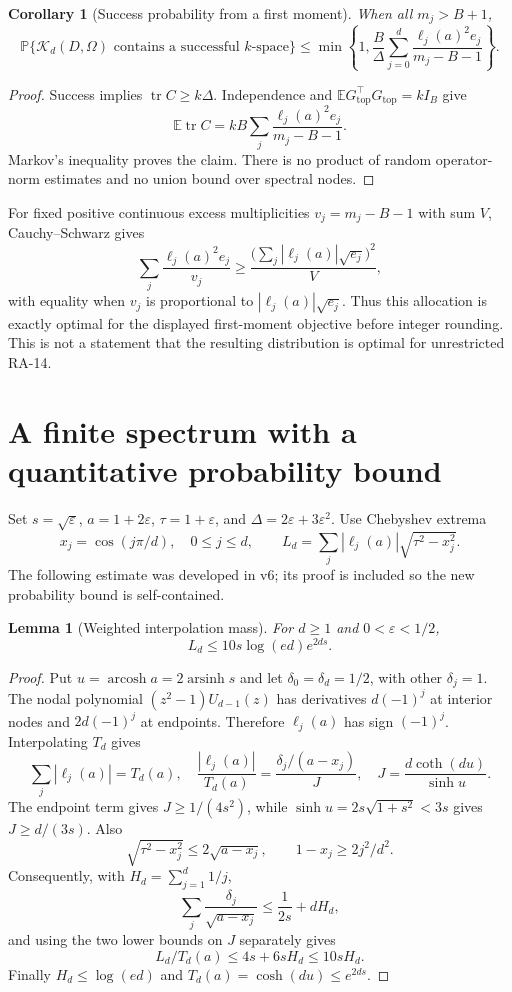 \documentclass[11pt]{article}
\newtheorem{lemma}[theorem]{Lemma}
\newtheorem{corollary}[theorem]{Corollary}
\theoremstyle{definition}
\newcommand{\E}{\mathbb E}
\newcommand{\Prob}{\mathbb P}
\newcommand{\tr}{\operatorname{tr}}
\newcommand{\K}{\mathcal K}
\begin{document}
\begin{corollary}[Success probability from a first moment]\label{cor:moment}
When all $m_j>B+1$,
\begin{equation}\label{eq:exactprob}
 \Prob\{\K_d(D,\Omega)\text{ contains a successful }k\text{-space}\}
 \le \min\left\{1,\frac{B}{\Delta}
 \sum_{j=0}^d\frac{\ell_j(a)^2e_j}{m_j-B-1}\right\}.
\end{equation}
\end{corollary}
\begin{proof}
Success implies $\tr C\ge k\Delta$. Independence and $\E G_{\mathrm{top}}^\top G_{\mathrm{top}}=kI_B$ give
\[
 \E\tr C=kB\sum_j\frac{\ell_j(a)^2e_j}{m_j-B-1}.
\]
Markov's inequality proves the claim. There is no product of random operator-norm estimates and no union bound over spectral nodes.
\end{proof}

For fixed positive continuous excess multiplicities $v_j=m_j-B-1$ with sum $V$, Cauchy--Schwarz gives
\[
 \sum_j\frac{\ell_j(a)^2e_j}{v_j}
 \ge\frac{\big(\sum_j|\ell_j(a)|\sqrt{e_j}\big)^2}{V},
\]
with equality when $v_j$ is proportional to $|\ell_j(a)|\sqrt{e_j}$. Thus this allocation is exactly optimal for the displayed first-moment objective before integer rounding. This is not a statement that the resulting distribution is optimal for unrestricted RA-14.

\section{A finite spectrum with a quantitative probability bound}\label{sec:primitive}
Set $s=\sqrt\varepsilon$, $a=1+2\varepsilon$, $\tau=1+\varepsilon$, and $\Delta=2\varepsilon+3\varepsilon^2$. Use Chebyshev extrema
\[
 x_j=\cos(j\pi/d),\quad 0\le j\le d,\qquad
 L_d=\sum_j|\ell_j(a)|\sqrt{\tau^2-x_j^2}.
\]
The following estimate was developed in v6; its proof is included so the new probability bound is self-contained.

\begin{lemma}[Weighted interpolation mass]\label{lem:mass}
For $d\ge1$ and $0<\varepsilon<1/2$,
\begin{equation}\label{eq:mass}
 L_d\le10s\log(ed)e^{2ds}.
\end{equation}
\end{lemma}
\begin{proof}
Put $u=\operatorname{arcosh}a=2\operatorname{arsinh}s$ and let $\delta_0=\delta_d=1/2$, with other $\delta_j=1$. The nodal polynomial $(z^2-1)U_{d-1}(z)$ has derivatives $d(-1)^j$ at interior nodes and $2d(-1)^j$ at endpoints. Therefore $\ell_j(a)$ has sign $(-1)^j$. Interpolating $T_d$ gives
\[
 \sum_j|\ell_j(a)|=T_d(a),\quad
 \frac{|\ell_j(a)|}{T_d(a)}=\frac{\delta_j/(a-x_j)}{J},\quad
 J=\frac{d\coth(du)}{\sinh u}.
\]
The endpoint term gives $J\ge1/(4s^2)$, while $\sinh u=2s\sqrt{1+s^2}<3s$ gives $J\ge d/(3s)$. Also
\[
 \sqrt{\tau^2-x_j^2}\le2\sqrt{a-x_j},\qquad
 1-x_j\ge2j^2/d^2.
\]
Consequently, with $H_d=\sum_{j=1}^d1/j$,
\[
 \sum_j\frac{\delta_j}{\sqrt{a-x_j}}\le\frac{1}{2s}+dH_d,
\]
and using the two lower bounds on $J$ separately gives
\[
 L_d/T_d(a)\le4s+6sH_d\le10sH_d.
\]
Finally $H_d\le\log(ed)$ and $T_d(a)=\cosh(du)\le e^{2ds}$.
\end{proof}
\end{document}
